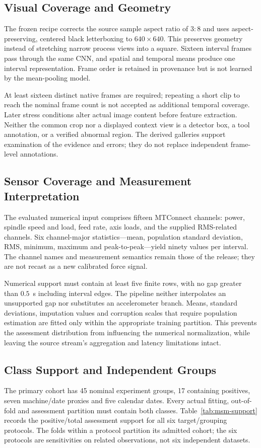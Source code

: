 \subsection{Visual Coverage and Geometry}
The frozen recipe corrects the source sample aspect ratio of $3{:}8$ and uses
aspect-preserving, centered black letterboxing to $640\times640$. This preserves
geometry instead of stretching narrow process views into a square. Sixteen interval
frames pass through the same CNN, and spatial and temporal means produce one interval
representation. Frame order is retained in provenance but is not learned by the
mean-pooling model.

At least sixteen distinct native frames are required; repeating a short clip to reach
the nominal frame count is not accepted as additional temporal coverage. Later stress
conditions alter actual image content before feature extraction. Neither the common crop
nor a displayed context view is a detector box, a tool annotation, or a verified
abnormal region. The derived galleries support examination of the evidence and errors;
they do not replace independent frame-level annotations.

\subsection{Sensor Coverage and Measurement Interpretation}
The evaluated numerical input comprises fifteen MTConnect channels: power, spindle speed
and load, feed rate, axis loads, and the supplied RMS-related channels. Six
channel-major statistics---mean, population standard deviation, RMS, minimum, maximum
and peak-to-peak---yield ninety values per interval. The channel names and measurement
semantics remain those of the release; they are not recast as a new calibrated force
signal.

Numerical support must contain at least five finite rows, with no gap greater than
$0.5$~s including interval edges. The pipeline neither interpolates an unsupported gap
nor substitutes an accelerometer branch. Means, standard deviations, imputation values
and corruption scales that require population estimation are fitted only within the
appropriate training partition. This prevents the assessment distribution from
influencing the numerical normalization, while leaving the source stream's aggregation
and latency limitations intact.

\subsection{Class Support and Independent Groups}
The primary cohort has 45 nominal experiment groups, 17 containing positives, seven
machine/date proxies and five calendar dates. Every actual fitting, out-of-fold and
assessment partition must contain both classes. Table~\ref{tab:msm-support} records the
positive/total assessment support for all six target/grouping protocols. The folds
within a protocol partition its admitted cohort; the six protocols are sensitivities on
related observations, not six independent datasets.

